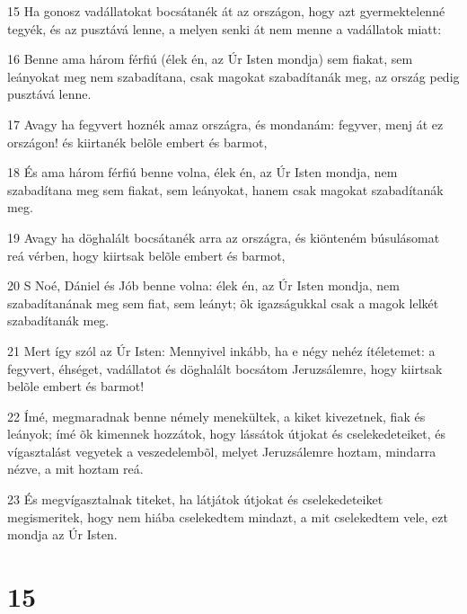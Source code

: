 \par 15 Ha gonosz vadállatokat bocsátanék át az országon, hogy azt gyermektelenné tegyék, és az pusztává lenne, a melyen senki át nem menne a vadállatok miatt:
\par 16 Benne ama három férfiú (élek én, az Úr Isten mondja) sem fiakat, sem leányokat meg nem szabadítana, csak magokat szabadítanák meg, az ország pedig pusztává lenne.
\par 17 Avagy ha fegyvert hoznék amaz országra, és mondanám: fegyver, menj át ez országon! és kiirtanék belõle embert és barmot,
\par 18 És ama három férfiú benne volna, élek én, az Úr Isten mondja, nem szabadítana meg sem fiakat, sem leányokat, hanem csak magokat szabadítanák meg.
\par 19 Avagy ha döghalált bocsátanék arra az országra, és kiönteném búsulásomat reá vérben, hogy kiirtsak belõle embert és barmot,
\par 20 S Noé, Dániel és Jób benne volna: élek én, az Úr Isten mondja, nem szabadítanának meg sem fiat, sem leányt; õk igazságukkal csak a magok lelkét szabadítanák meg.
\par 21 Mert így szól az Úr Isten: Mennyivel inkább, ha e négy nehéz ítéletemet: a fegyvert, éhséget, vadállatot és döghalált bocsátom Jeruzsálemre, hogy kiirtsak belõle embert és barmot!
\par 22 Ímé, megmaradnak benne némely menekültek, a kiket kivezetnek, fiak és leányok; ímé õk kimennek hozzátok, hogy lássátok útjokat és cselekedeteiket, és vígasztalást vegyetek a veszedelembõl, melyet Jeruzsálemre hoztam, mindarra nézve, a mit hoztam reá.
\par 23 És megvígasztalnak titeket, ha látjátok útjokat és cselekedeteiket megismeritek, hogy nem hiába cselekedtem mindazt, a mit cselekedtem vele, ezt mondja az Úr Isten.

\chapter{15}

